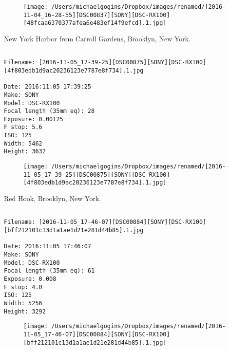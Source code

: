 \documentclass[11pt,letter,DIV=14,paper=landscape]{scrbook}
\begin{document}
\begin{figure}
\texttt{[image: /Users/michaelgogins/Dropbox/images/renamed/[2016-11-04\_16-28-55][DSC00837][SONY][DSC-RX100][48fcaa6370377afea6e483ef14f9efcd].1.jpg]}
\end{figure}
    
\clearpage
\noindent New York Harbor from Carroll Gardens, Brooklyn, New York.
\noindent
\begin{lstlisting}

Filename: [2016-11-05_17-39-25][DSC00875][SONY][DSC-RX100][4f803edb1d9ac20236123e7787e8f734].1.jpg

Date: 2016:11:05 17:39:25
Make: SONY
Model: DSC-RX100
Focal length (35mm eq): 28
Exposure: 0.00125
F stop: 5.6
ISO: 125
Width: 5462
Height: 3632
\end{lstlisting}
\clearpage

\begin{figure}
\texttt{[image: /Users/michaelgogins/Dropbox/images/renamed/[2016-11-05\_17-39-25][DSC00875][SONY][DSC-RX100][4f803edb1d9ac20236123e7787e8f734].1.jpg]}
\end{figure}
    
\clearpage
\noindent Red Hook, Brooklyn, New York.
\noindent
\begin{lstlisting}

Filename: [2016-11-05_17-46-07][DSC00884][SONY][DSC-RX100][bff212101c13d1a1ae1d21e281d44b85].1.jpg

Date: 2016:11:05 17:46:07
Make: SONY
Model: DSC-RX100
Focal length (35mm eq): 61
Exposure: 0.008
F stop: 4.0
ISO: 125
Width: 5256
Height: 3292
\end{lstlisting}
\clearpage

\begin{figure}
\texttt{[image: /Users/michaelgogins/Dropbox/images/renamed/[2016-11-05\_17-46-07][DSC00884][SONY][DSC-RX100][bff212101c13d1a1ae1d21e281d44b85].1.jpg]}
\end{figure}
    
\end{document}
